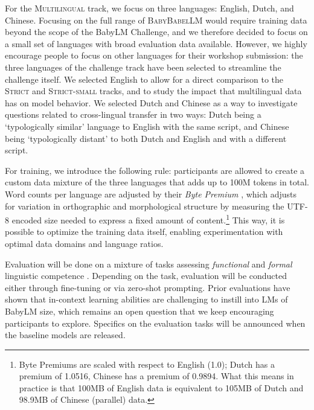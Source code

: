 \documentclass[11pt]{article}
\newcommand{\strict}[1]{\textsc{Strict}}
\newcommand{\strictsmall}[1]{\textsc{Strict-small}}
\newcommand{\multilingual}[1]{\textsc{Multilingual}}
\begin{document}
For the \multilingual{} track, we focus on three languages: English, Dutch, and Chinese.
Focusing on the full range of \textsc{BabyBabelLM} would require training data beyond the scope of the BabyLM Challenge, and we therefore decided to focus on a small set of languages with broad evaluation data available.
However, we highly encourage people to focus on other languages for their workshop submission: the three languages of the challenge track have been selected to streamline the challenge itself.
We selected English to allow for a direct comparison to the \strict{} and \strictsmall{} tracks, and to study the impact that multilingual data has on model behavior.
We selected Dutch and Chinese as a way to investigate questions related to cross-lingual transfer in two ways: Dutch being a `typologically similar' language to English with the same script, and Chinese being `typologically distant' to both Dutch and English and with a different script.

For training, we introduce the following rule: participants are allowed to create a custom data mixture of the three languages that adds up to 100M tokens in total.
Word counts per language are adjusted by their \textit{Byte Premium} \cite{arnett-etal-2024-bit}, which adjusts for variation in orthographic and morphological structure by measuring the UTF-8 encoded size needed to express a fixed amount of content.\footnote{Byte Premiums are scaled with respect to English (1.0); Dutch has a premium of 1.0516, Chinese has a premium of 0.9894. What this means in practice is that 100MB of English data is equivalent to 105MB of Dutch and 98.9MB of Chinese (parallel) data.}
This way, it is possible to optimize the training data itself, enabling experimentation with optimal data domains and language ratios.

Evaluation will be done on a mixture of tasks assessing \textit{functional} and \textit{formal} linguistic competence \citep{mahowald2024dissociating}.
Depending on the task, evaluation will be conducted either through fine-tuning or via zero-shot prompting. Prior evaluations have shown that in-context learning abilities are challenging to instill into LMs of BabyLM size, which remains an open question that we keep encouraging participants to explore.
Specifics on the evaluation tasks will be announced when the baseline models are released.
\end{document}
